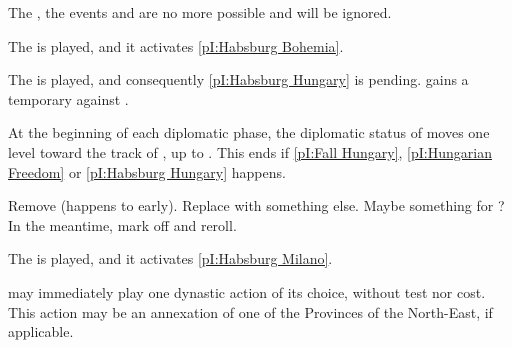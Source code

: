 \effetlong The , the events 
and  are no more possible and will be ignored.






\phevnt
\aparag The  is played, and it activates \ref{pI:Habsburg
  Bohemia}.






\phevnt
\aparag The  is played, and consequently \ref{pI:Habsburg
  Hungary} is pending.
\aparag \POL gains a temporary \CB against \paysHongrie.

\phdipl
\aparag At the beginning of each diplomatic phase, the diplomatic status of
\paysHongrie moves one level toward the track of \HAB, up to \EG. This ends if
\ref{pI:Fall Hungary}, \ref{pI:Hungarian Freedom} or \ref{pI:Habsburg Hungary}
happens.




\begin{todo}
  Remove (happens to early). Replace with something else. Maybe something for
  \DAN? In the meantime, mark off and reroll.
\end{todo}


\aparag The  is played, and it activates \ref{pI:Habsburg
  Milano}.




\phevnt
\aparag \SPA may immediately play one dynastic action of its choice, without
test nor cost.
\bparag This action may be an annexation of one of the Provinces of the
North-East, if applicable.



